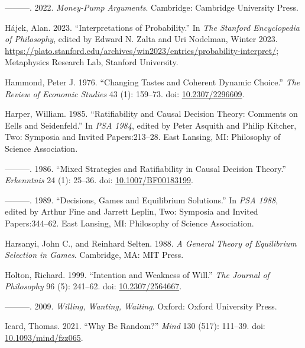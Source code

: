 \documentclass[
  11pt,
  letterpaper,
  DIV=11,
  numbers=noendperiod,
  twoside]{scrartcl}
\newlength{\cslhangindent}
\newenvironment{CSLReferences}[2] %
 {\begin{list}{}{%
  \setlength{\itemindent}{0pt}
  \setlength{\leftmargin}{0pt}
  \setlength{\parsep}{0pt}
  \ifodd #1
   \setlength{\leftmargin}{\cslhangindent}
   \setlength{\itemindent}{-1\cslhangindent}
  \fi
  \setlength{\itemsep}{#2\baselineskip}}}
 {\end{list}}
\begin{document}
\begin{CSLReferences}{1}{0}
---------. 2022. \emph{Money-Pump Arguments}. Cambridge: Cambridge
University Press.

Hájek, Alan. 2023. {``{Interpretations of Probability}.''} In \emph{The
{Stanford} Encyclopedia of Philosophy}, edited by Edward N. Zalta and
Uri Nodelman, {W}inter 2023.
\url{https://plato.stanford.edu/archives/win2023/entries/probability-interpret/};
Metaphysics Research Lab, Stanford University.

Hammond, Peter J. 1976. {``Changing Tastes and Coherent Dynamic
Choice.''} \emph{The Review of Economic Studies} 43 (1): 159--73. doi:
\href{https://doi.org/10.2307/2296609}{10.2307/2296609}.

Harper, William. 1985. {``Ratifiability and Causal Decision Theory:
Comments on Eells and Seidenfeld.''} In \emph{PSA 1984}, edited by Peter
Asquith and Philip Kitcher, Two: Symposia and Invited Papers:213--28.
East Lansing, MI: Philosophy of Science Association.

---------. 1986. {``Mixed Strategies and Ratifiability in Causal
Decision Theory.''} \emph{Erkenntnis} 24 (1): 25--36. doi:
\href{https://doi.org/10.1007/BF00183199}{10.1007/BF00183199}.

---------. 1989. {``Decisions, Games and Equilibrium Solutions.''} In
\emph{PSA 1988}, edited by Arthur Fine and Jarrett Leplin, Two: Symposia
and Invited Papers:344--62. East Lansing, MI: Philosophy of Science
Association.

Harsanyi, John C., and Reinhard Selten. 1988. \emph{A General Theory of
Equilibrium Selection in Games}. Cambridge, MA: {MIT} Press.

Holton, Richard. 1999. {``Intention and Weakness of Will.''} \emph{The
Journal of Philosophy} 96 (5): 241--62. doi:
\href{https://doi.org/10.2307/2564667}{10.2307/2564667}.

---------. 2009. \emph{Willing, Wanting, Waiting}. Oxford: Oxford
University Press.

Icard, Thomas. 2021. {``Why Be Random?''} \emph{Mind} 130 (517):
111--39. doi:
\href{https://doi.org/10.1093/mind/fzz065}{10.1093/mind/fzz065}.


\end{CSLReferences}
\end{document}
